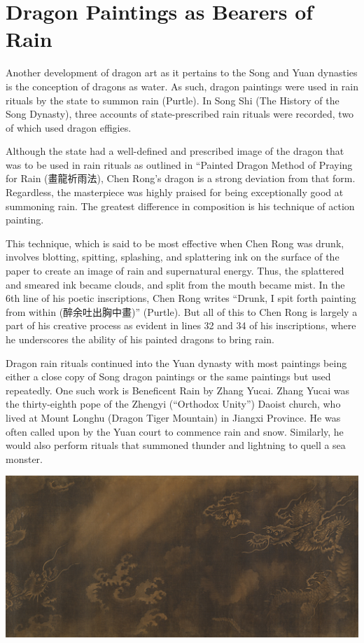 \documentclass[
]{book}
\begin{document}
\hypertarget{dragon-paintings-as-bearers-of-rain}{%
\section*{Dragon Paintings as Bearers of Rain}\label{dragon-paintings-as-bearers-of-rain}}

Another development of dragon art as it pertains to the Song and Yuan dynasties is the conception of dragons as water. As such, dragon paintings were used in rain rituals by the state to summon rain (Purtle). In Song Shi (The History of the Song Dynasty), three accounts of state-prescribed rain rituals were recorded, two of which used dragon effigies.

Although the state had a well-defined and prescribed image of the dragon that was to be used in rain rituals as outlined in ``Painted Dragon Method of Praying for Rain (畫龍祈雨法), Chen Rong's dragon is a strong deviation from that form. Regardless, the masterpiece was highly praised for being exceptionally good at summoning rain. The greatest difference in composition is his technique of action painting.

This technique, which is said to be most effective when Chen Rong was drunk, involves blotting, spitting, splashing, and splattering ink on the surface of the paper to create an image of rain and supernatural energy. Thus, the splattered and smeared ink became clouds, and split from the mouth became mist. In the 6th line of his poetic inscriptions, Chen Rong writes ``Drunk, I spit forth painting from within (醉余吐出胸中畫)'' (Purtle). But all of this to Chen Rong is largely a part of his creative process as evident in lines 32 and 34 of his inscriptions, where he underscores the ability of his painted dragons to bring rain.

Dragon rain rituals continued into the Yuan dynasty with most paintings being either a close copy of Song dragon paintings or the same paintings but used repeatedly. One such work is Beneficent Rain by Zhang Yucai. Zhang Yucai was the thirty-eighth pope of the Zhengyi (``Orthodox Unity'') Daoist church, who lived at Mount Longhu (Dragon Tiger Mountain) in Jiangxi Province. He was often called upon by the Yuan court to commence rain and snow. Similarly, he would also perform rituals that summoned thunder and lightning to quell a sea monster.

\includegraphics[width=1.2\textwidth,height=\textheight]{images/beneficent_Rain.png}
\end{document}
